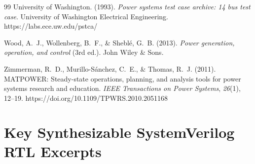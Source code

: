 \documentclass[11pt,a4paper]{report}
\begin{document}
\begin{thebibliography}{99}
University of Washington. (1993). \textit{Power systems test case archive: 14 bus test case}. University of Washington Electrical Engineering. https://labs.ece.uw.edu/pstca/

Wood, A.~J., Wollenberg, B.~F., \& Shebl{\'e}, G.~B. (2013). \textit{Power generation, operation, and control} (3rd ed.). John Wiley \& Sons.

Zimmerman, R.~D., Murillo-S{\'a}nchez, C.~E., \& Thomas, R.~J. (2011). MATPOWER: Steady-state operations, planning, and analysis tools for power systems research and education. \textit{IEEE Transactions on Power Systems}, \textit{26}(1), 12--19. https://doi.org/10.1109/TPWRS.2010.2051168

\end{thebibliography}

\appendix

\chapter{Key Synthesizable SystemVerilog RTL Excerpts}
\end{document}
